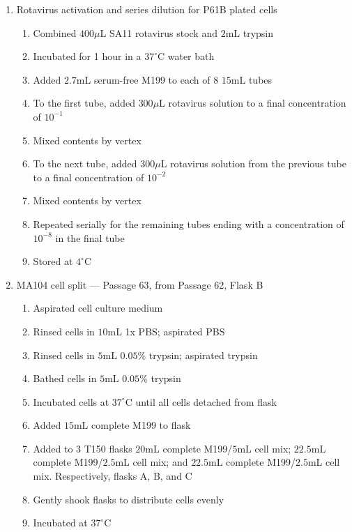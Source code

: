 \begin{enumerate}
	\item Rotavirus activation and series dilution for P61B plated cells
		\begin{enumerate}
			\item Combined $400\mu$L SA11 rotavirus stock and $2$mL trypsin
			\item Incubated for 1 hour in a $37^{\circ}$C water bath
			\item Added $2.7$mL serum-free M199 to each of 8 $15$mL tubes
			\item To the first tube, added $300\mu$L rotavirus solution to a final concentration of $10^{-1}$
			\item Mixed contents by vertex
			\item To the next tube, added $300\mu$L rotavirus solution from the previous tube to a final concentration of $10^{-2}$
			\item Mixed contents by vertex
			\item Repeated serially for the remaining tubes ending with a concentration of $10^{-8}$ in the final tube
			\item Stored at $4^{\circ}$C
		\end{enumerate}
	\item MA104 cell split --- Passage 63, from Passage 62, Flask B
		\begin{enumerate}
			\item Aspirated cell culture medium
			\item Rinsed cells in $10$mL 1x PBS; aspirated PBS
			\item Rinsed cells in $5$mL $0.05$\% trypsin; aspirated trypsin
			\item Bathed cells in $5$mL $0.05$\% trypsin
			\item Incubated cells at $37^{\circ}$C until all cells detached from flask
			\item Added $15$mL complete M199 to flask
			\item Added to $3$ T150 flasks $20$mL complete M199/$5$mL cell mix; $22.5$mL complete M199/$2.5$mL cell mix; and $22.5$mL complete M199/$2.5$mL cell mix. Respectively, flasks A, B, and C
			\item Gently shook flasks to distribute cells evenly
			\item Incubated at $37^{\circ}$C
		\end{enumerate}
\end{enumerate}